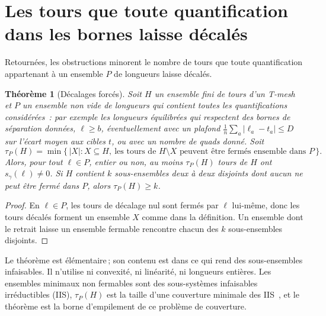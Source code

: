 \documentclass[11pt,a4paper]{article}
\newtheorem{theorem}{Théorème}
\newcommand{\shift}{s}
\newcommand{\lean}[1]{\texttt{\detokenize{#1}}}
\newenvironment{evidence}[3][]{}{}
\begin{document}
\section{Les tours que toute quantification dans les bornes laisse décalés}\label{sec:forced}

Retournées, les obstructions minorent le nombre de tours que toute
quantification appartenant à un ensemble $P$ de longueurs laisse décalés.

\begin{evidence}{lean}{\lean{forced_helices}, \lean{card_ge_of_disjoint}, \lean{tauP_ge_of_disjoint}, \lean{TMesh.forced_of_certificates}}
\begin{theorem}[Décalages forcés]\label{thm:forced}
Soit $H$ un ensemble fini de tours d'un T-mesh et $P$ un ensemble non vide de
longueurs qui contient toutes les quantifications considérées~: par exemple
les longueurs équilibrées qui respectent des bornes de séparation données,
$\ell \ge b$, éventuellement avec un plafond $\frac1n \sum_a |\ell_a - t_a|
\le D$ sur l'écart moyen aux cibles $t$, ou avec un nombre de quads donné.
Soit
\[
  \tau_P(H) = \min\bigl\{\, |X| : X \subseteq H,\ \text{les tours de } H
  \setminus X \text{ peuvent être fermés ensemble dans } P \,\bigr\}.
\]
Alors, pour tout $\ell \in P$, entier ou non, au moins $\tau_P(H)$ tours de
$H$ ont $\shift_\gamma(\ell) \neq 0$. Si $H$ contient $k$ sous-ensembles deux
à deux disjoints dont aucun ne peut être fermé dans $P$, alors $\tau_P(H) \ge
k$.
\end{theorem}
\end{evidence}

\begin{proof}
En $\ell \in P$, les tours de décalage nul sont fermés par $\ell$ lui-même,
donc les tours décalés forment un ensemble $X$ comme dans la définition. Un
ensemble dont le retrait laisse un ensemble fermable rencontre chacun des $k$
sous-ensembles disjoints.
\end{proof}

Le théorème est élémentaire\,; son contenu est dans ce qui rend des
sous-ensembles infaisables. Il n'utilise ni convexité, ni linéarité, ni
longueurs entières. Les ensembles minimaux non fermables sont des
sous-systèmes infaisables irréductibles (IIS), $\tau_P(H)$ est la taille d'une
couverture minimale des IIS~\cite{parker1996iis,amaldi2003maxfs}, et le
théorème est la borne d'empilement de ce problème de couverture.
\end{document}
